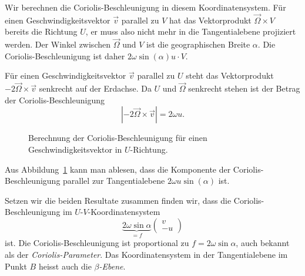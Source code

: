 Wir berechnen die Coriolis-Beschleunigung in diesem Koordinatensystem.
Für einen Geschwindigkeitsvektor $\vec{v}$ parallel zu $V$ hat das
Vektorprodukt $\vec{\Omega}\times V$ bereits die Richtung $U$,
er muss also nicht mehr in die Tangentialebene projiziert werden.
Der Winkel zwischen $\vec{\Omega}$ und $V$ ist die geographischen Breite
$\alpha$.
Die Coriolis-Beschleunigung ist daher $2\omega \sin(\alpha)u\cdot V$.

Für einen Geschwindigkeitsvektor $\vec{v}$ parallel zu $U$ steht
das Vektorprodukt $-2\vec{\Omega}\times\vec{v}$ senkrecht auf 
der Erdachse.
Da $U$ und $\vec{\Omega}$ senkrecht stehen ist der Betrag der 
Coriolis-Beschleunigung
\[
|\text{$-2\vec{\Omega}\times\vec{v}$}|
=
2\omega u.
\]
\begin{figure}
\centering
{}
\caption{Berechnung der Coriolis-Beschleunigung für einen
Geschwindigkeitsvektor in $U$-Richtung.
\label{skript:U-coriolis}}
\end{figure}%
Aus Abbildung~\ref{skript:U-coriolis} kann man ablesen,
dass die Komponente der Coriolis-Beschleunigung parallel
zur Tangentialebene $2\omega u\sin(\alpha)$ ist.

Setzen wir die beiden Resultate zusammen finden wir, dass die
Coriolis-Beschleunigung im $U$-$V$-Koordinatensystem
\begin{equation}
\underbrace{
2\omega
\sin\alpha}_{\displaystyle=f}
\begin{pmatrix}
v\\
-u
\end{pmatrix}
\end{equation}
ist.
Die Coriolis-Beschleunigung ist proportional zu $f=2\omega\sin\alpha$, auch
bekannt als der {\em Coriolis-Parameter}.
Das Koordinatensystem in der Tangentialebene im Punkt $B$ heisst auch
die {\em $\beta$-Ebene}.

